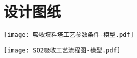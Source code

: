 \chapter{设计图纸}



\begin{dfigure}[H]
	\centering
	\texttt{[image: 吸收填料塔工艺参数条件-模型.pdf]}
	\label{design:1}
\end{dfigure}

%



\cleardoublepage
\begin{dfigure}[H]
	\centering
	\texttt{[image: SO2吸收工艺流程图-模型.pdf]}
	\label{design:2}
\end{dfigure}

%